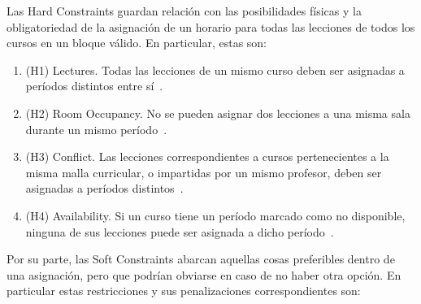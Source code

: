 \documentclass[letter, 10pt]{article}
\begin{document}
Las Hard Constraints guardan relaci\'on con las posibilidades f\'isicas y la obligatoriedad de la asignaci\'on de un horario para todas las lecciones de todos los cursos en un bloque v\'alido. En particular, estas son:

\begin{enumerate}
    \item (H1) Lectures. Todas las lecciones de un mismo curso deben ser asignadas a per\'iodos distintos entre s\'i~\cite{Hao2011LowerBounds,DiGaspero2007ITC}.
    \item (H2) Room Occupancy. No se pueden asignar dos lecciones a una misma sala durante un mismo per\'iodo~\cite{Hao2011LowerBounds,DiGaspero2007ITC}.
    \item (H3) Conflict. Las lecciones correspondientes a cursos pertenecientes a la misma malla curricular, o impartidas por un mismo profesor, deben ser asignadas a per\'iodos distintos~\cite{Hao2011LowerBounds,Ceschia2023Educational,DiGaspero2007ITC}.
    \item (H4) Availability. Si un curso tiene un per\'iodo marcado como no disponible, ninguna de sus lecciones puede ser asignada a dicho per\'iodo~\cite{Hao2011LowerBounds,Ceschia2023Educational,DiGaspero2007ITC}.
\end{enumerate}

Por su parte, las Soft Constraints abarcan aquellas cosas preferibles dentro de una asignaci\'on, pero que podr\'ian obviarse en caso de no haber otra opci\'on. En particular estas restricciones y sus penalizaciones correspondientes son:
\end{document}
